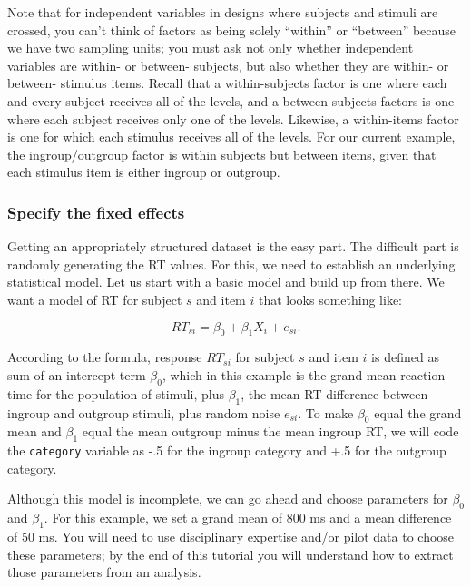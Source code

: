 \documentclass[doc,floatsintext]{apa6}
\begin{document}
Note that for independent variables in designs where subjects and
stimuli are crossed, you can't think of factors as being solely
\enquote{within} or \enquote{between} because we have two sampling
units; you must ask not only whether independent variables are within-
or between- subjects, but also whether they are within- or between-
stimulus items. Recall that a within-subjects factor is one where each
and every subject receives all of the levels, and a between-subjects
factors is one where each subject receives only one of the levels.
Likewise, a within-items factor is one for which each stimulus receives
all of the levels. For our current example, the ingroup/outgroup factor
is within subjects but between items, given that each stimulus item is
either ingroup or outgroup.

\subsubsection{Specify the fixed
effects}\label{specify-the-fixed-effects}

Getting an appropriately structured dataset is the easy part. The
difficult part is randomly generating the RT values. For this, we need
to establish an underlying statistical model. Let us start with a basic
model and build up from there. We want a model of RT for subject \(s\)
and item \(i\) that looks something like:

\begin{equation}
RT_{si} = \beta_0 + \beta_1 X_{i} + e_{si}.
\end{equation}

\noindent According to the formula, response \(RT_{si}\) for subject
\(s\) and item \(i\) is defined as sum of an intercept term \(\beta_0\),
which in this example is the grand mean reaction time for the population
of stimuli, plus \(\beta_1\), the mean RT difference between ingroup and
outgroup stimuli, plus random noise \(e_{si}\). To make \(\beta_0\)
equal the grand mean and \(\beta_1\) equal the mean outgroup minus the
mean ingroup RT, we will code the \texttt{category} variable as -.5 for
the ingroup category and +.5 for the outgroup category.

Although this model is incomplete, we can go ahead and choose parameters
for \(\beta_0\) and \(\beta_1\). For this example, we set a grand mean
of 800 ms and a mean difference of 50 ms. You will need to use
disciplinary expertise and/or pilot data to choose these parameters; by
the end of this tutorial you will understand how to extract those
parameters from an analysis.
\end{document}
